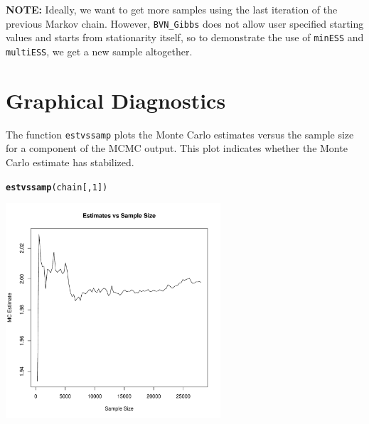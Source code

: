 \documentclass[11pt]{article}\usepackage[]{graphicx}\usepackage[]{color}
\makeatletter
\newcommand{\hlnum}[1]{\textcolor[rgb]{0.686,0.059,0.569}{#1}}%
\newcommand{\hlstd}[1]{\textcolor[rgb]{0.345,0.345,0.345}{#1}}%
\newcommand{\hlkwd}[1]{\textcolor[rgb]{0.737,0.353,0.396}{\textbf{#1}}}%
\newenvironment{kframe}{%
 \def\at@end@of@kframe{}%
 \ifinner\ifhmode%
  \def\at@end@of@kframe{\end{minipage}}%
  \begin{minipage}{\columnwidth}%
 \fi\fi%
 \def\FrameCommand##1{\hskip\@totalleftmargin \hskip-\fboxsep
 \colorbox{shadecolor}{##1}\hskip-\fboxsep
     \hskip-\linewidth \hskip-\@totalleftmargin \hskip\columnwidth}%
 \MakeFramed {\advance\hsize-\width
   \@totalleftmargin\z@ \linewidth\hsize
   \@setminipage}}%
 {\par\unskip\endMakeFramed%
 \at@end@of@kframe}
\newenvironment{knitrout}{}{} %
\makeatother
\begin{document}
\bigskip

\textbf{NOTE:} Ideally, we want to get more samples using the last iteration of the previous Markov chain. However, \texttt{BVN\_Gibbs} does not allow user specified starting values and starts from stationarity itself, so to demonstrate the use of \texttt{minESS} and \texttt{multiESS}, we get a new sample altogether. 

\section{Graphical Diagnostics}

The function \texttt{estvssamp} plots the Monte Carlo estimates versus the sample size for a component of the MCMC output. This plot indicates whether the Monte Carlo estimate has stabilized.

\begin{knitrout}
\color{fgcolor}\begin{kframe}
\begin{alltt}
\hlkwd{estvssamp}\hlstd{(chain[,}\hlnum{1}\hlstd{])}
\end{alltt}
\end{kframe}
\includegraphics[width=8cm]{figure/estvssamp-1} 

\end{knitrout}



\end{document}
